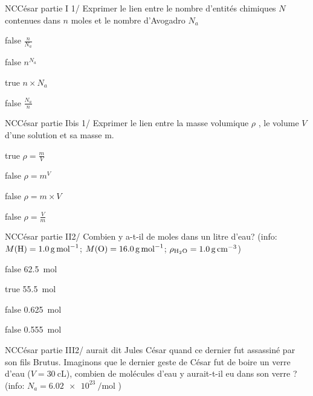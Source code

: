             \begin{question}{NC}{César partie I }{1}{/}
				 Exprimer le lien entre le nombre d'entités chimiques $N$ contenues dans $n$ moles et le nombre d'Avogadro $N_a$
            \end{question}
            \begin{reponses}
            	\item[false] $\frac{n}{N_a} $
            	\item[false] $n^{N_a}$
                \item[true]  $n\times N_a $
                \item[false] $\frac{N_a}{n} $
            \end{reponses}
			\begin{question}{NC}{César partie Ibis }{1}{/}
				 Exprimer le lien entre la masse volumique $\rho$ , le volume $V$ d'une solution et sa masse m.
            \end{question}
            \begin{reponses}
            	\item[true] $\rho = \frac{m}{V} $
            	\item[false] $\rho= m^{V}$
                \item[false]  $\rho = m\times V $
                \item[false] $\rho = \frac{V}{m} $
            \end{reponses}
            \begin{question}{NC}{César partie II}{2}{/}
				  Combien y a-t-il de moles dans un litre d'eau? (info: 
				  $M(\ce{H}) = \SI{1.0}{\gram\per\mole}$;
				  $M(\ce{O}) = \SI{16.0}{\gram\per\mole}$;
				  $\rho_{\ce{H2O}} = \SI{1.0}{\gram\per\centi\meter\cubed}$)
            \end{question}
            \begin{reponses}
            	\item[false] \SI{62.5}{\mole}
            	\item[true]  \SI{55.5}{\mole}
                \item[false] \SI{0.625}{\mole}
                \item[false] \SI{0.555}{\mole}
            \end{reponses}
            \begin{question}{NC}{César partie III}{2}{/}
				  aurait dit Jules César quand ce dernier fut assassiné par son fils Brutus. Imaginons que le dernier geste de César fut de boire un verre d'eau ($V=\SI{30}{\centi\liter}$), combien de molécules d'eau y aurait-t-il eu dans son verre ? (info:  $N_a = \SI{6.02e23}{\per\mole}$ )
            \end{question}
